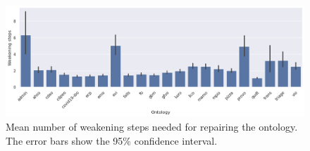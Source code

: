 \begin{figure}[ht]
  \centering
  \includegraphics[width=\textwidth]{resources/steps-ontology-bar.png}
  \caption{Mean number of weakening steps needed for repairing the ontology. The error bars show the 95\% confidence interval.}
\end{figure}

